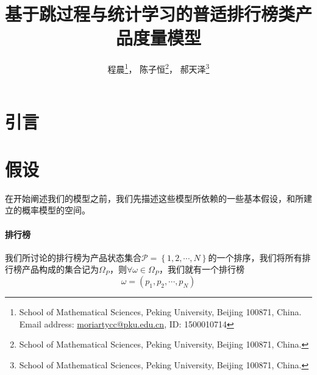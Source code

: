 \documentclass[UTF8]{ctexart}
\theoremstyle{plain}
\theoremstyle{definition}
\theoremstyle{remark}
\begin{document}
	\setcounter{footnote}{1}
	\title{基于跳过程与统计学习的普适排行榜类产品度量模型}
	\author{程晨\footnote{School of Mathematical Sciences, Peking University, Beijing 100871, China. Email address:
			\href{mailto:moriartycc@pku.edu.cn}{moriartycc@pku.edu.cn}, ID: 1500010714}， \quad 陈子恒\footnote{School of Mathematical Sciences, Peking University, Beijing 100871, China. }， \quad 郝天泽\footnote{School of Mathematical Sciences, Peking University, Beijing 100871, China. }}
	\date{}
	\maketitle
	\newpage
	\tableofcontents
	\newpage
	\section{引言}
	\section{假设}
	在开始阐述我们的模型之前，我们先描述这些模型所依赖的一些基本假设，和所建立的概率模型的空间。
	\paragraph{排行榜} 我们所讨论的排行榜为产品状态集合$\mathcal{P}=\left\{1,2,\cdots,N \right\}$的一个排序，我们将所有排行榜产品构成的集合记为$\Omega_P$，则$\forall \omega \in \Omega_P$，我们就有一个排行榜
	$$
	\omega = (p_1,p_2,\cdots,p_N)
	$$
\end{document}
